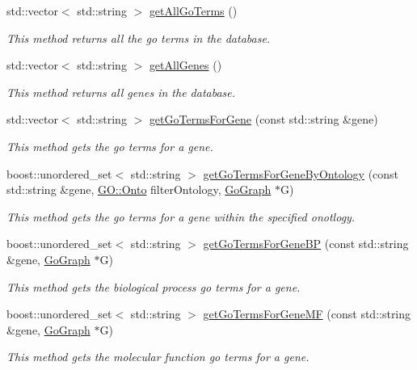 \begin{DoxyCompactItemize}
std\+::vector$<$ std\+::string $>$ \hyperlink{classAnnotationData_a8b99d05f5f0f619958e7850253946b9c}{get\+All\+Go\+Terms} ()
\begin{DoxyCompactList}\small\item\em This method returns all the go terms in the database. \end{DoxyCompactList}\item 
std\+::vector$<$ std\+::string $>$ \hyperlink{classAnnotationData_aa2d7d5ad9601b6984470b8267ff37db8}{get\+All\+Genes} ()
\begin{DoxyCompactList}\small\item\em This method returns all genes in the database. \end{DoxyCompactList}\item 
std\+::vector$<$ std\+::string $>$ \hyperlink{classAnnotationData_aee62a418cae2da15f4b3a4bd9f933376}{get\+Go\+Terms\+For\+Gene} (const std\+::string \&gene)
\begin{DoxyCompactList}\small\item\em This method gets the go terms for a gene. \end{DoxyCompactList}\item 
boost\+::unordered\+\_\+set$<$ std\+::string $>$ \hyperlink{classAnnotationData_ad1864b7768ab74d74be296e546269881}{get\+Go\+Terms\+For\+Gene\+By\+Ontology} (const std\+::string \&gene, \hyperlink{namespaceGO_a5ae335887b5cf40a9ef3045be9247fc3}{G\+O\+::\+Onto} filter\+Ontology, \hyperlink{classGoGraph}{Go\+Graph} $\ast$G)
\begin{DoxyCompactList}\small\item\em This method gets the go terms for a gene within the specified onotlogy. \end{DoxyCompactList}\item 
boost\+::unordered\+\_\+set$<$ std\+::string $>$ \hyperlink{classAnnotationData_a86fa8eaf6310627d530ab118c6e1e22b}{get\+Go\+Terms\+For\+Gene\+BP} (const std\+::string \&gene, \hyperlink{classGoGraph}{Go\+Graph} $\ast$G)
\begin{DoxyCompactList}\small\item\em This method gets the biological process go terms for a gene. \end{DoxyCompactList}\item 
boost\+::unordered\+\_\+set$<$ std\+::string $>$ \hyperlink{classAnnotationData_ab9639d4828270517550a3e739d03317b}{get\+Go\+Terms\+For\+Gene\+MF} (const std\+::string \&gene, \hyperlink{classGoGraph}{Go\+Graph} $\ast$G)
\begin{DoxyCompactList}\small\item\em This method gets the molecular function go terms for a gene. \end{DoxyCompactList}\item 

\end{DoxyCompactItemize}
